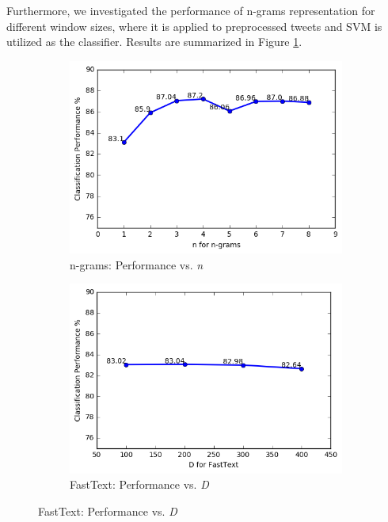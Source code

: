 Furthermore, we investigated the performance of n-grams representation for different window sizes, where it is applied to preprocessed tweets and SVM is utilized as the classifier.
Results are summarized in Figure \ref{fig:perf_ngrams}.

\begin{figure}[h!]
	\centering
	\begin{subfigure}{0.48\columnwidth}
		\centering
		\includegraphics[width=\linewidth]{ngrams.png}
		\caption{n-grams: Performance vs. \textit{n}}
		\label{fig:perf_ngrams}
	\end{subfigure}
	\begin{subfigure}{0.48\columnwidth}
		\centering
		\includegraphics[width=\linewidth]{fasttext.png}
		\caption{FastText: Performance vs. \textit{D}}
		\label{fig:perf_ft}
	\end{subfigure}
\end{figure}


